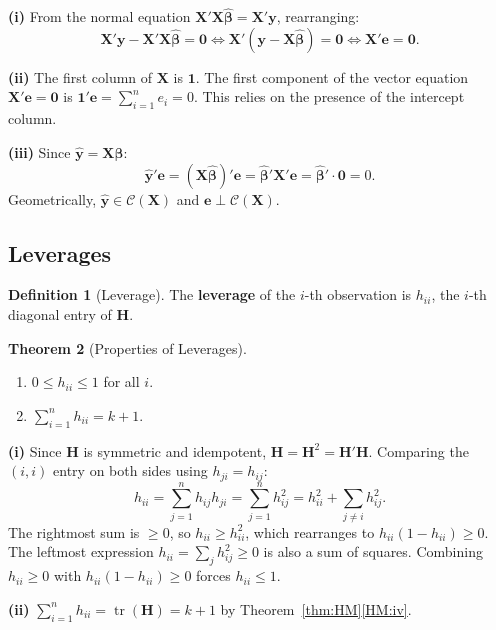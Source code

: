 \documentclass[12pt,a4paper]{article}
\makeatletter
\theoremstyle{definition}
\newtheorem{theorem}{Theorem}[section]
\newtheorem{definition}[theorem]{Definition}
\renewenvironment{proof}[1][\proofname]{\par
  \pushQED{\qed}%
  \normalfont \topsep6\p@\@plus6\p@\relax
  \trivlist
  \item[\hskip\labelsep\bfseries #1\@addpunct{.}]\ignorespaces
}{%
  \popQED\endtrivlist\@endpefalse
}
\DeclareMathOperator\tr{tr}
\newcommand{\bX}{\mathbf{X}}
\newcommand{\by}{\mathbf{y}}
\def\bb{\boldsymbol{\beta}}
\newcommand{\bH}{\mathbf{H}}
\newcommand{\bone}{\mathbf{1}}
\newcommand{\bzero}{\mathbf{0}}
\newcommand{\calC}{\mathcal{C}}
\makeatother
\begin{document}
\begin{proof}
\textbf{(i)} From the normal equation $\bX'\bX\hat{\bb} = \bX'\by$, rearranging:
\[
\bX'\by - \bX'\bX\hat{\bb} = \bzero \iff \bX'(\by - \bX\hat{\bb}) = \bzero \iff \bX'\mathbf{e} = \bzero.
\]

\textbf{(ii)} The first column of $\bX$ is $\bone$. The first component of the vector equation $\bX'\mathbf{e} = \bzero$ is $\bone'\mathbf{e} = \sum_{i=1}^{n} e_i = 0$. This relies on the presence of the intercept column.

\textbf{(iii)} Since $\hat{\by} = \bX\hat{\bb}$:
\[
\hat{\by}'\mathbf{e} = (\bX\hat{\bb})'\mathbf{e} = \hat{\bb}'\bX'\mathbf{e} = \hat{\bb}' \cdot \bzero = 0.
\]
Geometrically, $\hat{\by} \in \calC(\bX)$ and $\mathbf{e} \perp \calC(\bX)$.
\end{proof}

\subsection{Leverages}

\begin{definition}[Leverage]\label{def:leverage}
The \textbf{leverage} of the $i$-th observation is $h_{ii}$, the $i$-th diagonal entry of $\bH$.
\end{definition}

\begin{theorem}[Properties of Leverages]\label{thm:leverage}
\leavevmode
\begin{enumerate}[label=\textup{(\roman*)}]
\item\label{lev:i} $0 \leqslant h_{ii} \leqslant 1$ for all $i$.
\item $\sum_{i=1}^{n} h_{ii} = k + 1$.
\end{enumerate}
\end{theorem}

\begin{proof}
\textbf{(i)} Since $\bH$ is symmetric and idempotent, $\bH = \bH^2 = \bH'\bH$. Comparing the $(i, i)$ entry on both sides using $h_{ji} = h_{ij}$:
\[
h_{ii} = \sum_{j=1}^{n} h_{ij} h_{ji} = \sum_{j=1}^{n} h_{ij}^2 = h_{ii}^2 + \sum_{j \neq i} h_{ij}^2.
\]
The rightmost sum is $\geqslant 0$, so $h_{ii} \geqslant h_{ii}^2$, which rearranges to $h_{ii}(1 - h_{ii}) \geqslant 0$. The leftmost expression $h_{ii} = \sum_j h_{ij}^2 \geqslant 0$ is also a sum of squares. Combining $h_{ii} \geqslant 0$ with $h_{ii}(1 - h_{ii}) \geqslant 0$ forces $h_{ii} \leqslant 1$.

\textbf{(ii)} $\sum_{i=1}^{n} h_{ii} = \tr(\bH) = k + 1$ by Theorem~\ref{thm:HM}\ref{HM:iv}.
\end{proof}
\end{document}
